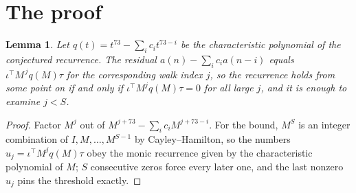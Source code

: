 \documentclass[11pt,a4paper]{article}
\theoremstyle{plain}
\newtheorem{lemma}[theorem]{Lemma}
\theoremstyle{definition}
\begin{document}
\section{The proof}

\begin{lemma}\label{lem:crit}
Let $q(t)=t^{73}-\sum_i c_it^{73-i}$ be the characteristic polynomial of the
conjectured recurrence. The residual $a(n)-\sum_ic_ia(n-i)$ equals
$\iota^{\!\top}M^{\,j}q(M)\tau$ for the corresponding walk index $j$, so the recurrence
holds from some point on if and only if $\iota^{\!\top}M^{j}q(M)\tau=0$ for all large $j$,
and it is enough to examine $j<S$.
\end{lemma}

\begin{proof}
Factor $M^{j}$ out of $M^{j+73}-\sum_ic_iM^{j+73-i}$. For the bound, $M^{S}$
is an integer combination of $I,M,\dots,M^{S-1}$ by Cayley--Hamilton, so the numbers
$u_j=\iota^{\!\top}M^{j}q(M)\tau$ obey the monic recurrence given by the characteristic
polynomial of $M$; $S$ consecutive zeros force every later one, and the last nonzero $u_j$
pins the threshold exactly.
\end{proof}
\end{document}
